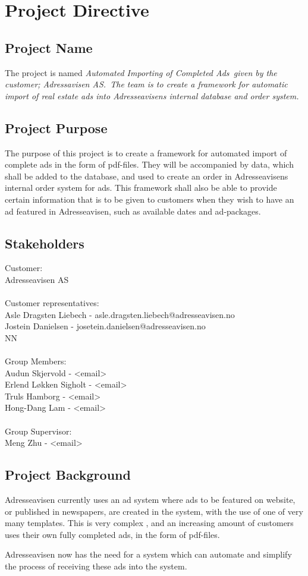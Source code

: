 \documentclass[12pt, a4paper]{article}
\begin{document}
\section{Project Directive}

\subsection{Project Name}
The project is named \em Automated Importing of Completed Ads\em \ given by the \\
customer; \em Adressavisen AS.\em \ The team is to create a framework for automatic import of real estate ads
into Adresseavisens internal database and order system.

\subsection{Project Purpose}
The purpose of this project is to create a framework for automated import of complete ads in the form of pdf-files. They will be accompanied by data, which shall be added to the database, and used to create an order in Adresseavisens internal order system for ads. This framework shall also be able to provide certain information that is to be given to customers when they wish to have an ad featured in Adresseavisen, such as available dates and ad-packages.

\subsection{Stakeholders}

Customer:\\
Adresseavisen AS\\
\\
Customer representatives:\\
Asle Dragsten Liebech - asle.dragsten.liebech@adresseavisen.no\\
Jostein Danielsen - josetein.danielsen@adresseavisen.no\\
NN\\
\\
Group Members:\\
Audun Skjervold - <email>\\
Erlend Løkken Sigholt - <email>\\
Truls Hamborg - <email>\\
Hong-Dang Lam - <email>\\
\\
Group Supervisor:\\
Meng Zhu - <email>
\\

\subsection{Project Background}
Adresseavisen currently uses an ad system where ads to be featured on website, or published in newspapers, are created in the system, with the use of one of very many templates. This is very complex , and an increasing amount of customers uses their own fully completed ads, in the form of pdf-files. 

Adresseavisen now has the need for a system which can automate and simplify the process of receiving these ads into the system.
\end{document}
